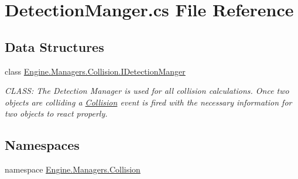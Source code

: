 \hypertarget{a00158}{}\section{Detection\+Manger.\+cs File Reference}
\label{a00158}
\subsection*{Data Structures}
\begin{DoxyCompactItemize}
\item 
class \hyperlink{a00502}{Engine.\+Managers.\+Collision.\+I\+Detection\+Manger}
\begin{DoxyCompactList}\small\item\em C\+L\+A\+SS\+: The Detection Manager is used for all collision calculations. Once two objects are colliding a \hyperlink{a00268}{Collision} event is fired with the necessary information for two objects to react properly. \end{DoxyCompactList}\end{DoxyCompactItemize}
\subsection*{Namespaces}
\begin{DoxyCompactItemize}
\item 
namespace \hyperlink{a00268}{Engine.\+Managers.\+Collision}
\end{DoxyCompactItemize}
